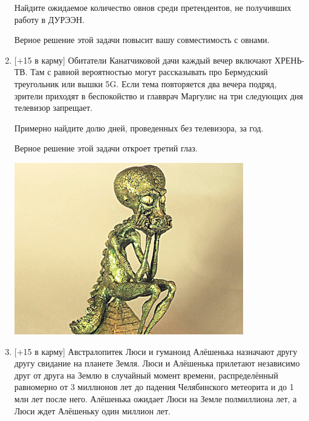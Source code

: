 \documentclass[12pt]{article}
\begin{document}
\begin{enumerate}[resume]
    Найдите ожидаемое количество овнов среди претендентов, не получивших работу в ДУРЭЭН. 

    Верное решение этой задачи повысит вашу совместимость с овнами. 

\newpage

    \item  $[+$15 в карму] Обитатели Канатчиковой дачи каждый вечер включают ХРЕНЬ-ТВ. Там с равной вероятностью могут рассказывать про Бермудский треугольник или вышки 5G. Если тема повторяется два вечера подряд, зрители приходят в беспокойство и главврач Маргулис на три следующих дня телевизор запрещает. 
    
    Примерно найдите долю дней, проведенных без телевизора, за год. 


    Верное решение этой задачи откроет третий глаз. 


    \begin{center}
    \includegraphics[width=10cm]{alyosha.png}
    \end{center}


    \item  $[+$15 в карму] Австралопитек Люси и гуманоид Алёшенька назначают другу другу свидание на планете Земля. Люси и Алёшенька прилетают независимо друг от друга на Землю в случайный момент времени, распределённый равномерно от 3 миллионов лет до падения Челябинского ме\-тео\-ри\-та и до 1 млн лет после него. Алёшенька ожидает Люси на Земле полмиллиона лет, а Люси ждет Алёшеньку один миллион лет. 
    

\end{enumerate}
\end{document}

